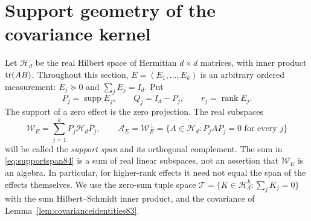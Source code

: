 \section{Support geometry of the covariance kernel}\label{sec:support84}
Let $\mathcal H_d$ be the real Hilbert space of Hermitian $d\times d$
matrices, with inner product $\operatorname{tr}(AB)$.  Throughout this section,
$E=(E_1,\ldots,E_k)$ is an arbitrary ordered measurement:
$E_j\succeq0$ and $\sum_jE_j=I_d$.  Put
\[
 P_j=\operatorname{supp}E_j,\qquad Q_j=I_d-P_j,\qquad r_j=\operatorname{rank}E_j.
\]
The support of a zero effect is the zero projection.  The real subspaces
\begin{equation}\label{eq:supportspan84}
 \mathcal W_E=\sum_{j=1}^k P_j\mathcal H_dP_j,
 \qquad \mathcal A_E=\mathcal W_E^\perp
   =\{A\in\mathcal H_d:P_jAP_j=0\text{ for every }j\}
\end{equation}
will be called the \emph{support span} and its orthogonal complement.
The sum in \eqref{eq:supportspan84} is a sum of real linear subspaces,
not an assertion that $\mathcal W_E$ is an algebra.  In particular,
for higher-rank effects it need not equal the span of the effects themselves.
We use the zero-sum tuple space
$\mathcal T=\{K\in\mathcal H_d^k:\sum_jK_j=0\}$ with the sum
Hilbert--Schmidt inner product, and the covariance of
Lemma~\ref{lem:covarianceidentities83}.

